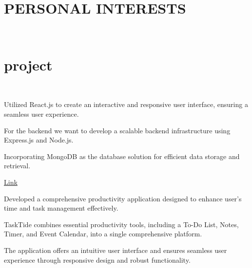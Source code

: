 \documentclass[]{deedy-resume-openfont}
\begin{document}
\begin{minipage}[t]{0.33\textwidth}
\section{PERSONAL INTERESTS}

\\


%
%

\end{minipage} 
\hfill
\begin{minipage}[t]{0.66\textwidth} 




\section{project}
\\
\location{}
\begin{tightemize}

\item Utilized React.js to create an interactive and responsive user interface, ensuring a seamless user experience.\\
\item For the backend we want to develop a scalable backend infrastructure using Express.js and Node.js.\\
\item Incorporating MongoDB as the database solution for efficient data storage and retrieval.

\end{tightemize}
\sectionsep


\href{https://}{Link}
\location{}
\begin{tightemize}

\item Developed a comprehensive productivity application designed to enhance user's time and task management effectively. \\
\item TaskTide combines essential productivity tools, including a To-Do List, Notes,
Timer, and Event Calendar, into a single comprehensive platform.
\item The application offers an intuitive user interface and ensures seamless user experience through responsive design and robust functionality.
\end{tightemize}
\end{minipage}
\end{document}
